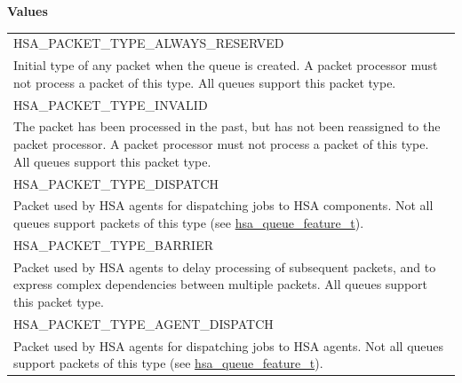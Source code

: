 \documentclass[final,oneside]{book}
\newcommand{\reftyp}[1]{#1}
\newcommand{\refenu}[1]{\reftyp{#1}}
\begin{document}
\noindent\textbf{Values}\\[-5mm]
\begin{longtable}{@{\hspace{2em}}p{\linewidth-2em}}
\hspace{-2em}\refenu{HSA_\-PACKET_\-TYPE_\-ALWAYS_\-RESERVED}\\Initial type of any packet when the queue is created. A packet processor must not process a packet of this type. All queues support this packet type.\\[2mm]
\hspace{-2em}\refenu{HSA_\-PACKET_\-TYPE_\-INVALID}\\The packet has been processed in the past, but has not been reassigned to the packet processor. A packet processor must not process a packet of this type. All queues support this packet type.\\[2mm]
\hspace{-2em}\refenu{HSA_\-PACKET_\-TYPE_\-DISPATCH}\\Packet used by HSA agents for dispatching jobs to HSA components. Not all queues support packets of this type (see \hyperlink{group__queue_1ga1145b01f6d9e2670179a22c92db39413}{hsa_\-queue_\-feature_\-t}).\\[2mm]
\hspace{-2em}\refenu{HSA_\-PACKET_\-TYPE_\-BARRIER}\\Packet used by HSA agents to delay processing of subsequent packets, and to express complex dependencies between multiple packets. All queues support this packet type.\\[2mm]
\hspace{-2em}\refenu{HSA_\-PACKET_\-TYPE_\-AGENT_\-DISPATCH}\\Packet used by HSA agents for dispatching jobs to HSA agents. Not all queues support packets of this type (see \hyperlink{group__queue_1ga1145b01f6d9e2670179a22c92db39413}{hsa_\-queue_\-feature_\-t}).
\end{longtable}
\end{document}
